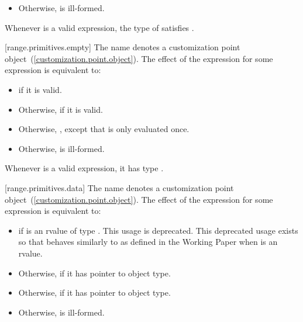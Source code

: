 {\begin{itemize}
\item
  Otherwise,  is ill-formed.
\end{itemize}

\pnum
\enternote Whenever  is a valid expression, the
type of  satisfies . \exitnote

[range.primitives.empty]{}
\pnum
The name  denotes a customization point
object~(\ref{customization.point.object}). The effect of the expression
 for some expression  is
equivalent to:

\begin{itemize}
\item
   if it is valid.

\item
  Otherwise,  if it is valid.

\item
  Otherwise, ,
  except that  is only evaluated once.

\item
  Otherwise,  is ill-formed.
\end{itemize}

\pnum
\remark Whenever  is a valid expression, it
has type .

[range.primitives.data]{}
\pnum
The name  denotes a customization point
object~(\ref{customization.point.object}). The effect of the expression
 for some expression  is
equivalent to:

\begin{itemize}
\item
   if  is an rvalue of
  type . This usage is deprecated. \enternote
  This deprecated usage exists so that  behaves
  similarly to  as defined in the \Cpp Working
  Paper when  is an rvalue. \exitnote

\item
  Otherwise,  if it has pointer to object type.

\item
  Otherwise,  if it has pointer to object type.

\item
  Otherwise,  is ill-formed.
\end{itemize}

}
